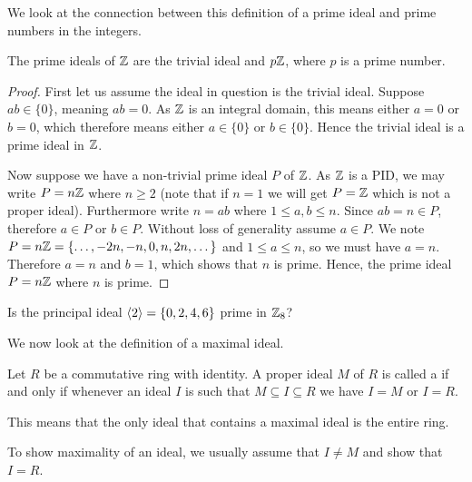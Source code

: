 We look at the connection between this definition of a prime ideal and prime numbers in the integers.
\begin{proposition}\label{prop-ideals-of-Z}
    The prime ideals of $\mathbb{Z}$ are the trivial ideal and $p\mathbb{Z}$, where $p$ is a prime number.
\end{proposition}
\begin{proof}
    First let us assume the ideal in question is the trivial ideal. Suppose $ab \in \{0\}$, meaning $ab = 0$. As $\mathbb{Z}$ is an integral domain, this means either $a = 0$ or $b = 0$, which therefore means either $a \in \{0\}$ or $b \in \{0\}$. Hence the trivial ideal is a prime ideal in $\mathbb{Z}$.

    Now suppose we have a non-trivial prime ideal $P$ of $\mathbb{Z}$. As $\mathbb{Z}$ is a PID, we may write $P = n\mathbb{Z}$ where $n \geq 2$ (note that if $n = 1$ we will get $P = \mathbb{Z}$ which is not a proper ideal). Furthermore write $n = ab$ where $1 \leq a,b \leq n$. Since $ab = n \in P$, therefore $a \in P$ or $b \in P$. Without loss of generality assume $a \in P$. We note $P = n\mathbb{Z} = \{\dots, -2n, -n, 0, n, 2n, \dots\}$ and $1 \leq a \leq n$, so we must have $a = n$. Therefore $a = n$ and $b = 1$, which shows that $n$ is prime. Hence, the prime ideal $P = n\mathbb{Z}$ where $n$ is prime.
\end{proof}
\begin{exercise}
    Is the principal ideal $\left\langle2\right\rangle = \{0, 2, 4, 6\}$ prime in $\mathbb{Z}_8$?
\end{exercise}

We now look at the definition of a maximal ideal.
\begin{definition}
    Let $R$ be a commutative ring with identity. A proper ideal $M$ of $R$ is called a  if and only if whenever an ideal $I$ is such that $M \subseteq I \subseteq R$ we have $I = M$ or $I = R$.
\end{definition}
\begin{remark}
    This means that the only ideal that contains a maximal ideal is the entire ring.
\end{remark}
\begin{remark}
    To show maximality of an ideal, we usually assume that $I \neq M$ and show that $I = R$.
\end{remark}

